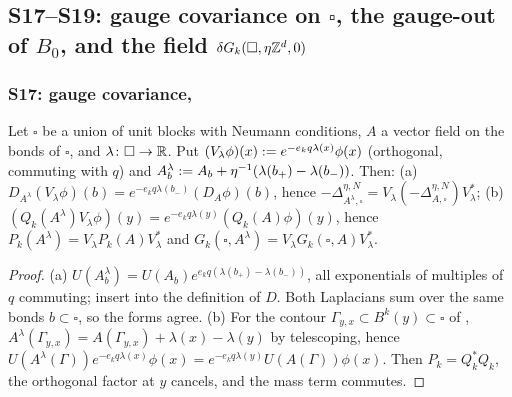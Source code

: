 
\subsection{S17--S19: gauge covariance on $\square$, the gauge-out of $B_0$, and the field $\delta G_k(\square,\eta\mathbb Z^d,0)$}\label{sup4:ssec:S17}

\subsubsection*{S17: gauge covariance, \cite[p.~433]{Ba3}}

\begin{lemma}\label{sup4:lem:S171}
Let $\square$ be a union of unit blocks with Neumann conditions, $A$ a vector field on the bonds of $\square$, and $\lambda\colon\square\to\mathbb R$. Put $(V_\lambda\phi)(x):= e^{-e_kq\lambda(x)}\phi(x)$ (orthogonal, commuting with $q$) and $A^\lambda_b:= A_b+\eta^{-1}(\lambda(b_+)-\lambda(b_-))$. Then: \textup{(a)} $D_{A^\lambda}(V_\lambda\phi)(b)=e^{-e_kq\lambda(b_-)}(D_A\phi)(b)$, hence $-\Delta^{\eta,N}_{A^\lambda,\square}=V_\lambda(-\Delta^{\eta,N}_{A,\square})V_\lambda^*$; \textup{(b)} $(Q_k(A^\lambda)V_\lambda\phi)(y)=e^{-e_kq\lambda(y)}(Q_k(A)\phi)(y)$, hence $P_k(A^\lambda)=V_\lambda P_k(A)V_\lambda^*$ and $G_k(\square,A^\lambda)=V_\lambda G_k(\square,A)V_\lambda^*$.
\end{lemma}

\begin{proof}
(a) $U(A^\lambda_b)=U(A_b)e^{e_kq(\lambda(b_+)-\lambda(b_-))}$, all exponentials of multiples of $q$ commuting; insert into the definition of $D$. Both Laplacians sum over the same bonds $b\subset\square$, so the forms agree. (b) For the contour $\Gamma_{y,x}\subset B^k(y)\subset\square$ of \cite[(2.1)]{Ba1}, $A^\lambda(\Gamma_{y,x})=A(\Gamma_{y,x})+\lambda(x)-\lambda(y)$ by telescoping, hence $U(A^\lambda(\Gamma))e^{-e_kq\lambda(x)}\phi(x)=e^{-e_kq\lambda(y)}U(A(\Gamma))\phi(x)$. Then $P_k=Q_k^*Q_k$, the orthogonal factor at $y$ cancels, and the mass term commutes.
\end{proof}

